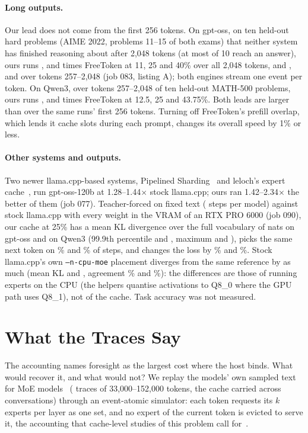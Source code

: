 \documentclass[10pt,twocolumn]{article}
\begin{document}
\paragraph{Long outputs.} Our lead does not come from the first 256 tokens. On gpt-oss, on ten held-out hard
problems (AIME 2022, problems 11--15 of both exams) that neither system has finished reasoning about after 2{,}048
tokens (at most \hardAnsMax{} of 10 reach an answer), ours runs \hardAllA, \hardAllB{} and \hardAllC{} times FreeToken
at 11, 25 and 40\% over all 2{,}048 tokens, and \hardLateA, \hardLateB{} and \hardLateC{} over tokens 257--2{,}048
(job 083, listing A); both engines stream one event per token. On Qwen3, over tokens 257--2{,}048 of ten held-out
MATH-500 problems, ours runs \longQwenA{}, \longQwenB{} and \longQwenC{} times FreeToken at 12.5, 25 and 43.75\%.
Both leads are larger than over the same runs' first 256 tokens. Turning off FreeToken's prefill overlap, which lends
it cache slots during each prompt, changes its overall speed by 1\% or less.

\paragraph{Other systems and outputs.} Two newer llama.cpp-based systems, Pipelined Sharding~\cite{pipelinedsharding2026} and
leloch's expert cache~\cite{leloch2026}, run gpt-oss-120b at 1.28--1.44$\times$ stock llama.cpp; ours ran 1.42--2.34$\times$
the better of them (job 077). Teacher-forced on fixed text (\klStepsGpt{} steps per model) against stock llama.cpp with every weight in the
VRAM of an RTX PRO 6000 (job 090), our cache at 25\% has a mean KL divergence over the full vocabulary of
\klMeanGpt{} nats on gpt-oss and \klMeanQwen{} on Qwen3 (99.9th percentile \klNinetyNineGpt{} and \klNinetyNineQwen,
maximum \klMaxGpt{} and \klMaxQwen), picks the same next token on \klTopGpt\% and \klTopQwen\% of steps, and changes
the loss by \klNllGpt\% and \klNllQwen\%. Stock llama.cpp's own \texttt{--n-cpu-moe} placement diverges from the same
reference by as much (mean KL \klStockMeanGpt{} and \klStockMeanQwen, agreement \klStockTopGpt\% and \klStockTopQwen\%):
the differences are those of running experts on the CPU (the helpers quantise activations to Q8\_0 where the GPU path
uses Q8\_1), not of the cache. Task accuracy was not measured.

\section{What the Traces Say}\label{sec:traces}
The accounting names foresight as the largest cost where the host binds. What would recover it, and what would not?
We replay the models' own sampled text for \fsModels{} MoE models~\cite{muennighoff2024olmoe,yang2025qwen3,openai2025gptoss}
(\polModels{} traces of 33{,}000--152{,}000 tokens, the cache carried across conversations) through an event-atomic
simulator: each token requests its $k$ experts per layer as one set, and no expert of the current token is evicted to
serve it, the accounting that cache-level studies of this problem call for~\cite{zhang2026reproducible}.
\end{document}

